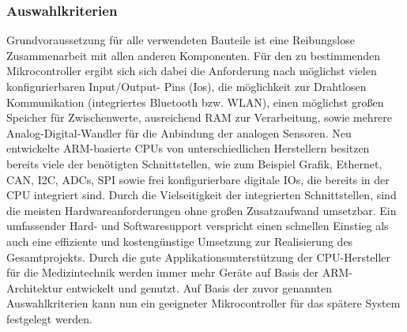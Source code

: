 \subsubsection{Auswahlkriterien} \label{auswahlkriterien-1}

Grundvoraussetzung für alle verwendeten Bauteile ist eine Reibungslose Zusammenarbeit mit allen anderen Komponenten. Für den zu bestimmenden Mikrocontroller ergibt sich sich dabei die Anforderung nach möglichst vielen konfigurierbaren Input/Output- Pins (Ios), die möglichkeit zur Drahtlosen Kommunikation (integriertes Bluetooth bzw. WLAN), einen möglichst großen Speicher für Zwischenwerte, ausreichend RAM zur Verarbeitung, sowie mehrere Analog-Digital-Wandler für die Anbindung der analogen Sensoren. Neu entwickelte ARM-basierte CPUs von unterschiedlichen Herstellern besitzen bereits viele der benötigten Schnittstellen, wie zum Beispiel Grafik, Ethernet, CAN, I2C, ADCs, SPI sowie frei konfigurierbare digitale IOs, die bereits in der CPU integriert sind. Durch die Vielseitigkeit der integrierten Schnittstellen, sind die meisten Hardwareanforderungen ohne großen Zusatzaufwand umsetzbar. Ein umfassender Hard- und Softwaresupport verspricht  einen schnellen Einstieg als auch eine effiziente und kostengünstige Umsetzung zur Realisierung
des Gesamtprojekts. Durch die gute Applikationsunterstützung der CPU-Hersteller für die Medizintechnik werden immer mehr Geräte auf Basis der ARM-Architektur entwickelt und genutzt. Auf Basis der zuvor genannten Auswahlkriterien kann nun ein geeigneter Mikrocontroller für das spätere System festgelegt werden.


